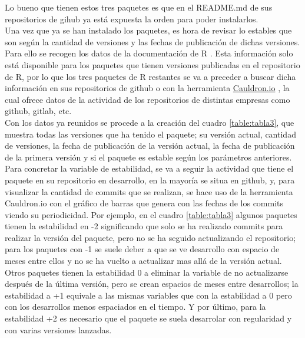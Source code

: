 \documentclass{article}\usepackage[]{graphicx}\usepackage[]{color}
\begin{document}
Lo bueno que tienen estos tres paquetes es que en el README.md de sus repositorios de gihub ya est\'a expuesta la orden para poder instalarlos.~\\
Una vez que ya se han instalado los paquetes, es hora de revisar lo estables que son seg\'un la cantidad de versiones y las fechas de publicaci\'on de dichas versiones. Para ello se recogen los datos de la documentaci\'on de R %
. Esta informaci\'on solo est\'a disponible para los paquetes que tienen versiones publicadas en el repositorio de R, por lo que los tres paquetes de R restantes se va a preceder a buscar dicha informaci\'on en sus repositorios de github o con la herramienta \href{https://cauldron.io/}{Cauldron.io} %
, la cual ofrece datos de la actividad de los repositorios de distintas empresas como github, gitlab, etc.~\\
Con los datos ya reunidos se procede a la creaci\'on del cuadro \ref{table:tabla3}, que muestra todas las versiones que ha tenido el paquete; su versi\'on actual, cantidad de versiones, la fecha de publicaci\'on de la versi\'on actual, la fecha de publicaci\'on de la primera versi\'on y si el paquete es estable seg\'un los par\'ametros anteriores.~\\
Para concretar la variable de estabilidad, se va a seguir la actividad que tiene el paquete en su repositorio en desarrollo, en la mayor\'ia se situa en github, y, para visualizar la cantidad de commits que se realizan, se hace uso de la herramienta Cauldron.io con el gr\'afico de barras que genera con las fechas de los commits viendo su periodicidad. Por ejemplo, en el cuadro \ref{table:tabla3} algunos paquetes tienen la estabilidad en -2 significando que solo se ha realizado commits para realizar la versi\'on del paquete, pero no se ha seguido actualizando el repositorio; para los paquetes con -1 se suele deber a que se ve desarrollo con espacio de meses entre ellos y no se ha vuelto a actualizar mas all\'a de la versi\'on actual. Otros paquetes tienen la estabilidad 0 a eliminar la variable de no actualizarse despu\'es de la \'ultima versi\'on, pero se crean espacios de meses entre desarrollos; la estabilidad a +1 equivale a las mismas variables que con la estabilidad a 0 pero con los desarrollos menos espaciados en el tiempo. Y por \'ultimo, para la estabilidad +2 es necesario que el paquete se suela desarrolar con regularidad y con varias versiones lanzadas.
\end{document}
